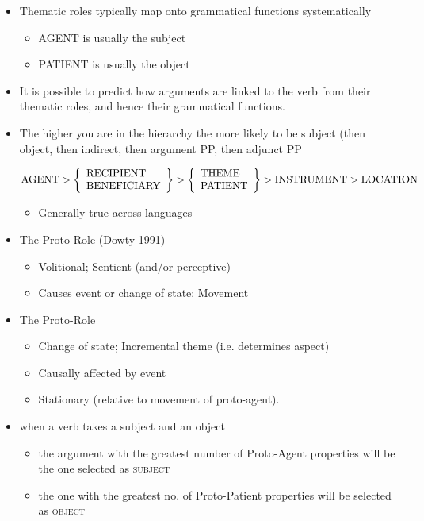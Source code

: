 \documentclass[headrule,footrule]{foils}
\begin{document}
\begin{itemize}
\item    Thematic roles typically map onto grammatical 
  functions systematically
  \begin{itemize}
  \item  AGENT is usually the subject
  \item  PATIENT is usually the object
  \end{itemize}
\item  It is possible to predict how arguments are linked to 
  the verb from their thematic roles, and hence their 
  grammatical functions.
\item {} The higher you are in the
  hierarchy the more likely to be subject (then object, then indirect,
  then argument PP, then adjunct PP
  \begin{small}
    \[ \mbox{AGENT} > \left\{\begin{array}[c]{l} \mbox{RECIPIENT} \\
        \mbox{BENEFICIARY} \end{array} \right\} >
    \left\{\begin{array}[c]{l} \mbox{THEME} \\
        \mbox{PATIENT} \end{array} \right\} > \mbox{INSTRUMENT} >
    \mbox{LOCATION} \]
  \end{small}
  \begin{itemize}
  \item  Generally true across languages
  \end{itemize}
\end{itemize}


\begin{itemize}
\item  The  Proto-Role (Dowty 1991)
\begin{itemize}
\item  Volitional;  Sentient (and/or perceptive)
\item  Causes event or change of state;  Movement
\end{itemize}
\item  The  Proto-Role
\begin{itemize}
\item  Change of state; Incremental theme (i.e. determines aspect)
\item  Causally affected by event
\item  Stationary (relative to movement of proto-agent).     
\end{itemize}
\item   when a verb takes a subject and an object
  \begin{itemize}
  \item  the argument with the greatest number of Proto-Agent 
    properties will be the one selected as \textsc{subject}
  \item  the one with the greatest no. of Proto-Patient properties 
    will be selected as \textsc{object}
  \end{itemize}
\end{itemize}
\end{document}

